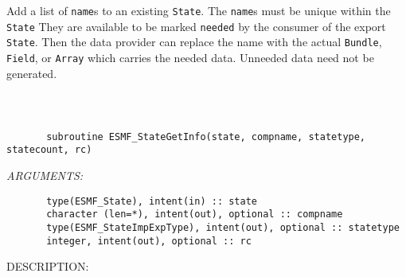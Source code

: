         Add a list of {\tt name}s to an existing {\tt State}.
        The {\tt name}s must be unique within the {\tt State}
        They are available to be marked {\tt needed} by the
        consumer of the export {\tt State}. Then the data 
        provider can replace the name with the actual {\tt Bundle},
        {\tt Field}, or {\tt Array} which carries the needed data.
        Unneeded data need not be generated.
  
\begin{verbatim} \end{verbatim}
 
 
\mbox{}\hrulefill\ 
 

\begin{verbatim}       subroutine ESMF_StateGetInfo(state, compname, statetype, statecount, rc)\end{verbatim}{\em ARGUMENTS:}
\begin{verbatim}       type(ESMF_State), intent(in) :: state
       character (len=*), intent(out), optional :: compname
       type(ESMF_StateImpExpType), intent(out), optional :: statetype
       integer, intent(out), optional :: rc             
 \end{verbatim}
{\sf DESCRIPTION:\\ }


